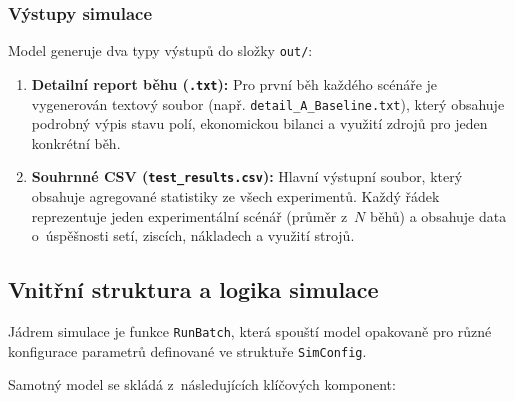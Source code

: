 \documentclass[11pt,a4paper]{article}
\begin{document}
\subsubsection*{Výstupy simulace}
Model generuje dva typy výstupů do složky \texttt{out/}:
\begin{enumerate}
    \item \textbf{Detailní report běhu (\texttt{.txt}):} Pro první běh každého scénáře je vygenerován textový soubor (např. \texttt{detail\_A\_Baseline.txt}), který obsahuje podrobný výpis stavu polí, ekonomickou bilanci a využití zdrojů pro jeden konkrétní běh.
    \item \textbf{Souhrnné CSV (\texttt{test\_results.csv}):} Hlavní výstupní soubor, který obsahuje agregované statistiky ze všech experimentů. Každý řádek reprezentuje jeden experimentální scénář (průměr z~$N$ běhů) a obsahuje data o~úspěšnosti setí, ziscích, nákladech a využití strojů.
\end{enumerate}

\subsection{Vnitřní struktura a logika simulace}

Jádrem simulace je funkce \texttt{RunBatch}, která spouští model opakovaně pro různé konfigurace parametrů definované ve struktuře \texttt{SimConfig}.

Samotný model se skládá z~následujících klíčových komponent:
\end{document}
